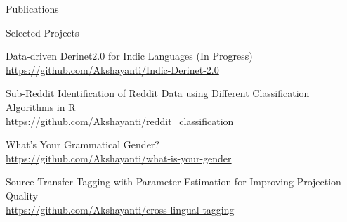 \documentclass{resume} %
\begin{document}

\begin{rSection}{Publications}

    {}

    {}

    {}
    
    {}

    {}

\end{rSection}



\begin{rSection}{Selected Projects}

    {Data-driven Derinet2.0 for Indic Languages (In Progress)}\\
        \url{https://github.com/Akshayanti/Indic-Derinet-2.0}

    {Sub-Reddit Identification of Reddit Data using Different Classification Algorithms in R}\\
        \url{https://github.com/Akshayanti/reddit_classification}

    {What's Your Grammatical Gender?}\\
        \url{https://github.com/Akshayanti/what-is-your-gender}

    {Source Transfer Tagging with Parameter Estimation for Improving Projection Quality}\\
        \url{https://github.com/Akshayanti/cross-lingual-tagging}

\end{rSection}


\end{document}
